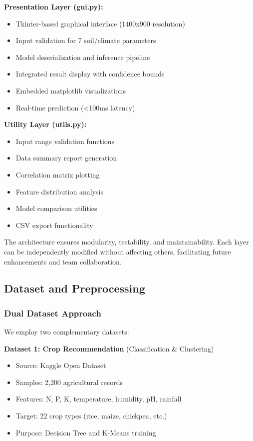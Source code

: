 \documentclass[conference]{IEEEtran}
\begin{document}
\textbf{Presentation Layer (gui.py):}
\begin{itemize}
    \item Tkinter-based graphical interface (1400x900 resolution)
    \item Input validation for 7 soil/climate parameters
    \item Model deserialization and inference pipeline
    \item Integrated result display with confidence bounds
    \item Embedded matplotlib visualizations
    \item Real-time prediction (<100ms latency)
\end{itemize}

\textbf{Utility Layer (utils.py):}
\begin{itemize}
    \item Input range validation functions
    \item Data summary report generation
    \item Correlation matrix plotting
    \item Feature distribution analysis
    \item Model comparison utilities
    \item CSV export functionality
\end{itemize}

The architecture ensures modularity, testability, and maintainability. Each layer can be independently modified without affecting others, facilitating future enhancements and team collaboration.

\subsection{Dataset and Preprocessing}

\subsubsection{Dual Dataset Approach}
We employ two complementary datasets:

\textbf{Dataset 1: Crop Recommendation} (Classification \& Clustering)
\begin{itemize}
    \item Source: Kaggle Open Dataset
    \item Samples: 2,200 agricultural records
    \item Features: N, P, K, temperature, humidity, pH, rainfall
    \item Target: 22 crop types (rice, maize, chickpea, etc.)
    \item Purpose: Decision Tree and K-Means training
\end{itemize}
\end{document}
